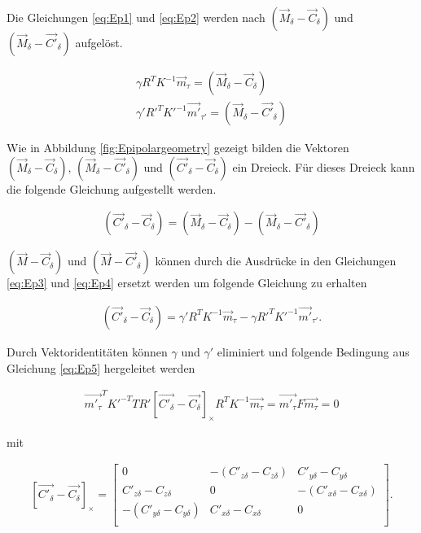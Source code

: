 Die Gleichungen \ref{eq:Ep1} und \ref{eq:Ep2} werden nach $(\overrightarrow{M}_\delta-\overrightarrow{C}_\delta)$ und $(\overrightarrow{M}_\delta-\overrightarrow{C'}_\delta)$ aufgelöst.

\begin{gather}
	\gamma R^TK^{-1}\overrightarrow{m}_\tau = (\overrightarrow{M}_\delta-\overrightarrow{C}_\delta)\label{eq:Ep3}\\
	\gamma' R'^TK'^{-1}\overrightarrow{m'}_{\tau'} = (\overrightarrow{M}_\delta-\overrightarrow{C'}_\delta)\label{eq:Ep4}
\end{gather}


Wie in Abbildung \ref{fig:Epipolargeometry} gezeigt bilden die Vektoren $(\overrightarrow{M}_\delta - \overrightarrow{C}_\delta),\, (\overrightarrow{M}_\delta - \overrightarrow{C'}_\delta)$ und $(\overrightarrow{C'}_\delta - \overrightarrow{C}_\delta)$ ein Dreieck. Für dieses Dreieck kann die folgende Gleichung aufgestellt werden. 

\begin{gather}
	(\overrightarrow{C'}_\delta - \overrightarrow{C}_\delta) = (\overrightarrow{M}_\delta - \overrightarrow{C}_\delta) - (\overrightarrow{M}_\delta - \overrightarrow{C'}_\delta)
\end{gather}

$(\overrightarrow{M}-\overrightarrow{C}_\delta)$ und $(\overrightarrow{M} - \overrightarrow{C'}_\delta)$ können durch die Ausdrücke in den Gleichungen \ref{eq:Ep3} und \ref{eq:Ep4} ersetzt werden um folgende Gleichung zu erhalten

\begin{gather}
	(\vec{C'}_\delta - \vec{C}_\delta) = \gamma' R^TK^{-1}\vec{m}_\tau - \gamma R'^TK'^{-1}\vec{m'}_{\tau'}. \label{eq:Ep5}
\end{gather}

Durch Vektoridentitäten können $\gamma$ und $\gamma'$ eliminiert und folgende Bedingung aus Gleichung \ref{eq:Ep5} hergeleitet werden \cite{Bronstein,Elements} %

\begin{gather}
	\vec{m'_\tau}^TK'^{-T}TR' \left[ \vec{C'_\delta}-\vec{C_\delta}\right]_\times R^TK^{-1}\vec{m_\tau}=\vec{m'_\tau}F\vec{m_\tau} = 0\label{eq:Ep6}
\end{gather}

mit  

\begin{gather}
	\left[ \vec{C'_\delta}-\vec{C_\delta}\right]_\times=
	\begin{bmatrix}0&-(C'_{z\delta}-C_{z\delta})&C'_{y\delta}-C_{y\delta}\\
		C'_{z\delta}-C_{z\delta}&0&-(C'_{x\delta}-C_{x\delta})\\
		-(C'_{y\delta}-C_{y\delta})&C'_{x \delta}-C_{x\delta}&0\\
	\end{bmatrix}.
\end{gather}

